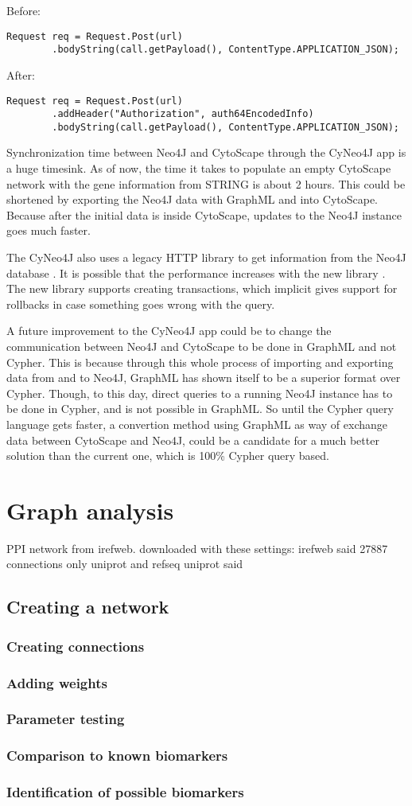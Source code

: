 Before:
\begin{verbatim}
Request req = Request.Post(url)
        .bodyString(call.getPayload(), ContentType.APPLICATION_JSON);
\end{verbatim}

After:
\begin{verbatim}
Request req = Request.Post(url)
        .addHeader("Authorization", auth64EncodedInfo)
        .bodyString(call.getPayload(), ContentType.APPLICATION_JSON);
\end{verbatim}

Synchronization time between Neo4J and CytoScape through the CyNeo4J app is a
huge timesink. As of now, the time it takes to populate an empty CytoScape
network with the gene information from STRING is about 2 hours. This could be
shortened by exporting the Neo4J data with GraphML and into CytoScape. Because
after the initial data is inside CytoScape, updates to the Neo4J instance goes
much faster.

The CyNeo4J also uses a legacy HTTP library to get information from the Neo4J
database \cite{legacy-neo4j}. It is possible that the performance increases with
the new library \cite{transactional-neo4j}. The new library supports creating
transactions, which implicit gives support for rollbacks in case something goes
wrong with the query.

A future improvement to the CyNeo4J app could be to change the communication
between Neo4J and CytoScape to be done in GraphML and not Cypher. This is
because through this whole process of importing and exporting data from and to
Neo4J, GraphML has shown itself to be a superior format over Cypher. Though, to
this day, direct queries to a running Neo4J instance has to be done in Cypher,
and is not possible in GraphML. So until the Cypher query language gets faster,
a convertion method using GraphML as way of exchange data between CytoScape and
Neo4J, could be a candidate for a much better solution than the current one,
which is 100\% Cypher query based.

\chapter{Graph analysis}
PPI network from irefweb.
downloaded with these settings: %
irefweb said 27887 connections %
only uniprot and refseq
uniprot said
\section{Creating a network}
\subsection{Creating connections}
\subsection{Adding weights}
\subsection{Parameter testing}
\subsection{Comparison to known biomarkers}
\subsection{Identification of possible biomarkers}
